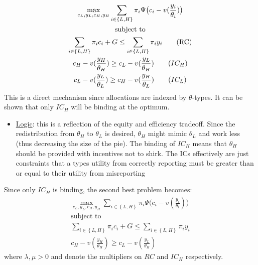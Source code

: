 \documentclass{article}
\begin{document}
\begin{itemize}
\begin{itemize}
\begin{itemize}
            \begin{gather*}
                \max_{c_{L}, y_{L}, c_{H}, y_{H}} \sum_{i \in \left\{ L, H \right\} } \pi_{i} \Psi \big( c_{i} - v(\frac{y_{i}}{\theta_{i}}) \big) \\
                \text{subject to} \\
                \sum_{i \in \left\{ L,H \right\} } \pi_{i} c_{i} + G \leq \sum_{i \in \left\{ L,H \right\} } \pi_{i} y_{i} \tag{RC} \\
                c_{H} - v(\frac{y_{H}}{\theta_{H}}) \geq c_{L} - v(\frac{y_{L}}{\theta_{H}}) \tag{$IC_{H}$} \\
                c_{L} - v(\frac{y_{L}}{\theta_{L}}) \geq c_{H} - v(\frac{y_{H}}{\theta_{L}}) \tag{$IC_{L}$}
            \end{gather*}
            This is a direct mechanism since allocations are indexed by $\theta$-types. It can be shown that only $IC_{H}$ will be binding at the optimum.
            \begin{itemize}
                \item  \underline{Logic}: this is a reflection of the equity and efficiency tradeoff. Since the redistribution from $\theta_{H}$ to $\theta_{L}$ is desired, $\theta_{H}$ might mimic $\theta_{L}$ and work less (thus decreasing the size of the pie). The binding of $IC_{H}$ means that $\theta_{H}$ should be provided with incentives not to shirk. The ICs effectively are just constraints that a types utility from correctly reporting must be greater than or equal to their utility from misreporting
            \end{itemize}
            Since only $IC_{H}$ is binding, the second best problem becomes:
            \begin{gather*}
                \max_{c_{L}, y_{L}, c_{H}, y_{H}} \sum_{i \in \left\{L, H \right\}} \pi_{i} \Psi \big( c_{i} - v(\frac{y_{i}}{\theta_{i}}) \big) \\
                \text{subject to} \\
                \sum_{i \in \left\{L,H \right\}} \pi_{i} c_{i} + G \leq \sum_{i \in \left\{L,H \right\}} \pi_{i} y_{i} \tag{$\lambda$} \\
                c_{H} - v(\frac{y_{H}}{\theta_{H}}) \geq c_{L} - v(\frac{y_{L}}{\theta_{H}}) \tag{$\mu$}
            \end{gather*}
            where $\lambda, \mu > 0$ and denote the multipliers on $RC$ and $IC_{H}$ respectively.
            \begin{itemize}

\end{itemize}
\end{itemize}
\end{itemize}
\end{itemize}
\end{document}
